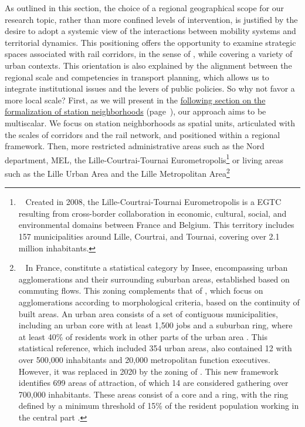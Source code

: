 \begin{refsegment}
As outlined in this section, the choice of a regional geographical scope for our research topic, rather than more confined levels of intervention, is justified by the desire to adopt a systemic view of the interactions between mobility systems and territorial dynamics. This positioning offers the opportunity to examine strategic spaces associated with rail corridors, in the sense of  \textcolor{blue}{\autocite[63]{liu_corridors_2016}}, while covering a variety of urban contexts. This orientation is also explained by the alignment between the regional scale and competencies in transport planning, which allows us to integrate institutional issues and the levers of public policies. So why not favor a more local scale? First, as we will present in the \hyperref[chap3:quartiers-gare]{following section on the formalization of station neighborhoods} (page~\pageref{chap3:quartiers-gare}), our approach aims to be multiscalar. We focus on station neighborhoods as spatial units, articulated with the scales of corridors and the rail network, and positioned within a regional framework. Then, more restricted administrative areas such as the Nord department, \acrfull{MEL}, the Lille-Courtrai-Tournai Eurometropolis\footnote{~
    Created in 2008, the Lille-Courtrai-Tournai Eurometropolis is a \acrfull{EGTC} resulting from cross-border collaboration in economic, cultural, social, and environmental domains between France and Belgium. This territory includes 157 municipalities around Lille, Courtrai, and Tournai, covering over 2.1 million inhabitants.
} or living areas such as the Lille Urban Area and the Lille Metropolitan Area\footnote{~
    In France,  constitute a statistical category by Insee, encompassing urban agglomerations and their surrounding suburban areas, established based on commuting flows. This zoning complements that of , which focus on agglomerations according to morphological criteria, based on the continuity of built areas. An urban area consists of a set of contiguous municipalities, including an urban core with at least 1,500 jobs and a suburban ring, where at least 40\% of residents work in other parts of the urban area \textcolor{blue}{\autocite{geoconfluences_aire_2024}}. This statistical reference, which included 354 urban areas, also contained 12  with over 500,000 inhabitants and 20,000 metropolitan function executives. However, it was replaced in 2020 by the zoning of  \textcolor{blue}{\autocite{brutel_maillage_2011}}. This new framework identifies 699 areas of attraction, of which 14 are considered  gathering over 700,000 inhabitants. These areas consist of a core and a ring, with the ring defined by a minimum threshold of 15\% of the resident population working in the central part \textcolor{blue}{\autocite{insee_aires_2021}}.
}
\end{refsegment}

